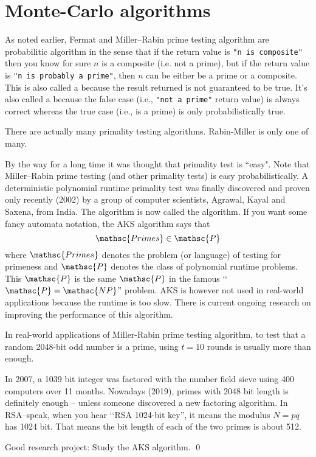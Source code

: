 \section{Monte-Carlo algorithms}

As noted earlier, Fermat and Miller--Rabin prime testing algorithm
are probabilitic algorithm in the sense that if the
return value is \verb!"n is composite"! then you know for sure $n$ is a
composite (i.e. not a prime), 
but if the return value is
\verb!"n is probably a prime"!,
then $n$ can be either be a prime or a
composite.
This is also called a
because the result returned is not guaranteed to be true.
It's also called a  because the
false case (i.e., \verb!"not a prime"! return value) is always correct whereas the
true case (i.e., is a prime) is only probabilistically true.

There are actually many primality testing algorithms.
Rabin-Miller is only one of many.

By the way for a long time it was thought that primality test is
``easy".
Note that Miller--Rabin prime testing (and other primality tests)
is easy probabilistically.
A deterministic polynomial runtime
primality test was finally discovered and proven only recently
(2002) by a group of computer scientists, Agrawal, Kayal and Saxena, from India.
The algorithm is now called the
algorithm.
If you want some fancy automata notation, the AKS algorithm
says that
\[
  \mathsc{Primes} \in \mathsc{P}
\]
where $\mathsc{Primes}$ denotes the problem (or language) of
testing for primeness and $\mathsc{P}$
denotes the class of polynomial runtime problems.
This $\mathsc{P}$ is the same $\mathsc{P}$ in the famous
\lq\lq$\mathsc{P} = \mathsc{NP}$'' problem.
AKS is however not used in real-world applications because the runtime
is too slow.
There is current ongoing research on improving the performance
of this algorithm.

In real-world applications of Miller-Rabin prime testing algorithm,
to test that a random 2048-bit odd number is a prime,
using $t = 10$ rounds is usually more than enough.

In 2007, a 1039 bit integer was factored with the number field sieve using
400 computers over 11 months.
Nowadays (2019), primes with 2048 bit length is definitely enough -- unless
someone discovered a new factoring algorithm.
In RSA--speak, when you hear \lq\lq RSA 1024-bit key'', it means
the modulus $N = pq$ has 1024 bit.
That means the bit length of each of the two primes is about 512.


\begin{ex}
  Good research project:
  Study the AKS algorithm.
  \qed
\end{ex}
